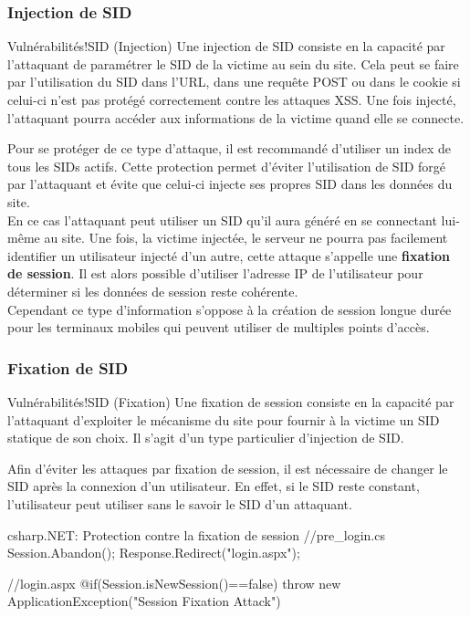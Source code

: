 \subsubsection{Injection de SID}
\begin{Define}{Vulnérabilités!SID (Injection)}
Une injection de \gls{SID} consiste en la capacité par l'attaquant de paramétrer le SID de la victime au sein du site. Cela peut se faire par l'utilisation du SID dans l'URL, dans une requête POST ou dans le cookie si celui-ci n'est pas protégé correctement contre les attaques XSS. Une fois injecté, l'attaquant pourra accéder aux informations de la victime quand elle se connecte.
\end{Define}
Pour se protéger de ce type d'attaque, il est recommandé d'utiliser un index de tous les SIDs actifs. Cette protection permet d'éviter l'utilisation de SID forgé par l'attaquant et évite que celui-ci injecte ses propres SID dans les données du site. \\
En ce cas l'attaquant peut utiliser un SID qu'il aura généré en se connectant lui-même au site. Une fois, la victime injectée, le serveur ne pourra pas facilement identifier un utilisateur injecté d'un autre, cette attaque s'appelle une \textbf{fixation de session}. Il est alors possible d'utiliser l'adresse IP de l'utilisateur pour déterminer si les données de session reste cohérente.\\

Cependant ce type d'information s'oppose à la création de session longue durée pour les terminaux mobiles qui peuvent utiliser de multiples points d'accès.
\subsubsection{Fixation de SID}
\begin{Define}{Vulnérabilités!SID (Fixation)}
Une fixation de session consiste en la capacité par l'attaquant d'exploiter le mécanisme du site pour fournir à la victime un SID statique de son choix. Il s'agit d'un type particulier d'injection de SID.
\end{Define}
Afin d'éviter les attaques par fixation de session, il est nécessaire de changer le SID après la connexion d'un utilisateur. En effet, si le SID reste constant, l'utilisateur peut utiliser sans le savoir le SID d'un attaquant. 
\begin{Config}{csharp}{.NET: Protection contre la fixation de session}
//pre_login.cs
Session.Abandon();
Response.Redirect("login.aspx");

//login.aspx
@if(Session.isNewSession()==false)
	throw new ApplicationException("Session Fixation Attack")
\end{Config}


